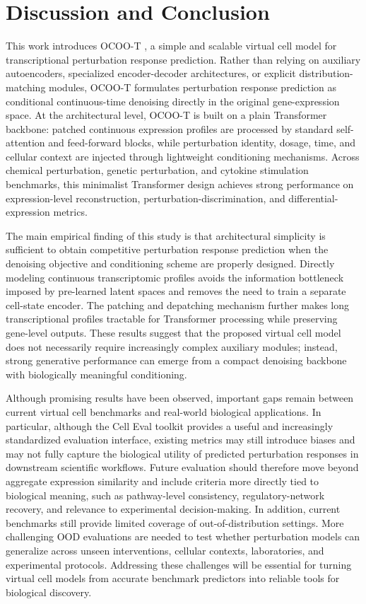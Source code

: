 \documentclass[11pt]{article}
\newcommand{\ocoot}{OCOO-T }
\begin{document}
\section{Discussion and Conclusion}

This work introduces \ocoot, a simple and scalable virtual cell model for transcriptional perturbation response prediction. Rather than relying on auxiliary autoencoders, specialized encoder-decoder architectures, or explicit distribution-matching modules, OCOO-T formulates perturbation response prediction as conditional continuous-time denoising directly in the original gene-expression space. At the architectural level, OCOO-T is built on a plain Transformer backbone: patched continuous expression profiles are processed by standard self-attention and feed-forward blocks, while perturbation identity, dosage, time, and cellular context are injected through lightweight conditioning mechanisms. Across chemical perturbation, genetic perturbation, and cytokine stimulation benchmarks, this minimalist Transformer design achieves strong performance on expression-level reconstruction, perturbation-discrimination, and differential-expression metrics.

The main empirical finding of this study is that architectural simplicity is sufficient to obtain competitive perturbation response prediction when the denoising objective and conditioning scheme are properly designed. Directly modeling continuous transcriptomic profiles avoids the information bottleneck imposed by pre-learned latent spaces and removes the need to train a separate cell-state encoder. The patching and depatching mechanism further makes long transcriptional profiles tractable for Transformer processing while preserving gene-level outputs. These results suggest that the proposed virtual cell model does not necessarily require increasingly complex auxiliary modules; instead, strong generative performance can emerge from a compact denoising backbone with biologically meaningful conditioning.

Although promising results have been observed, important gaps remain between current virtual cell benchmarks and real-world biological applications. In particular, although the Cell Eval toolkit provides a useful and increasingly standardized evaluation interface, existing metrics may still introduce biases and may not fully capture the biological utility of predicted perturbation responses in downstream scientific workflows. Future evaluation should therefore move beyond aggregate expression similarity and include criteria more directly tied to biological meaning, such as pathway-level consistency, regulatory-network recovery, and relevance to experimental decision-making. In addition, current benchmarks still provide limited coverage of out-of-distribution settings. More challenging OOD evaluations are needed to test whether perturbation models can generalize across unseen interventions, cellular contexts, laboratories, and experimental protocols. Addressing these challenges will be essential for turning virtual cell models from accurate benchmark predictors into reliable tools for biological discovery.
\end{document}
